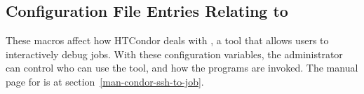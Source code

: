%
%
%
%

\subsection{\label{sec:Config-ssh-to-job}Configuration File Entries
Relating to }

These macros affect how HTCondor deals with ,
a tool that allows users to interactively debug jobs.  
With these configuration variables, 
the administrator can control who can use the tool,
and how the  programs are invoked.
The manual page for  is at
section~\ref{man-condor-ssh-to-job}.


